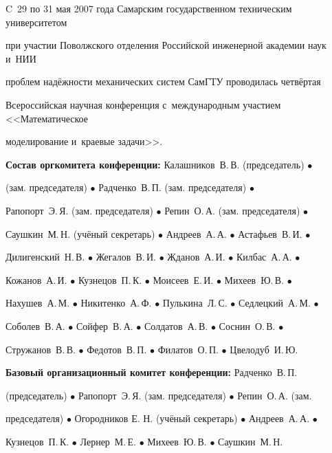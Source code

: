 C~29 по 31 мая 2007 года Самарским государственном техническим университетом 

при участии Поволжского отделения Российской инженерной академии наук и~НИИ 

проблем надёжности механических систем \mbox{СамГТУ} проводилась четвёртая 

Всероссийская научная конференция с~международным участием <<Математическое 

моделирование и~краевые задачи>>.



\smallskip



\textbf{Состав оргкомитета конференции:} Калашников~В.\,В. (председатель) $\bullet$ 

 (зам. председателя) $\bullet$ Радченко~В.\,П. (зам. председателя) $\bullet$ 

Рапопорт~Э.\,Я. (зам. председателя) $\bullet$ Репин~О.\,А. (зам. председателя) $\bullet$ 

Саушкин~М.\,Н. (учёный секретарь) $\bullet$ Андреев~А.\,А. $\bullet$ Астафьев~В.\,И. $\bullet$ 

Дилигенский~Н.\,В. $\bullet$ Жегалов~В.\,И. $\bullet$ Жданов~А.\,И. $\bullet$ Килбас~А.\,А. $\bullet$ 

Кожанов~А.\,И. $\bullet$ Кузнецов~П.\,К. $\bullet$ Моисеев~Е.\,И. $\bullet$ Михеев~Ю.\,В. $\bullet$ 

Нахушев~А.\,М. $\bullet$ Никитенко~А.\,Ф. $\bullet$ Пулькина~Л.\,С. $\bullet$ Седлецкий~А.\,М. $\bullet$ 

Соболев~В.\,А. $\bullet$ Сойфер~В.\,А. $\bullet$ Солдатов~А.\,В. $\bullet$ Соснин~О.\,В. $\bullet$ 

Стружанов~В.\,В. $\bullet$ Федотов~В.\,П. $\bullet$ Филатов~О.\,П. $\bullet$ Цвелодуб~И.\,Ю.



\smallskip



\textbf{Базовый организационный комитет конференции:} Радченко~В.\,П. 

(председатель) $\bullet$ Рапопорт~Э.\,Я. (зам. председателя) $\bullet$ Репин~О.\,А. (зам. 

председателя) $\bullet$ Огородников Е. Н. (учёный секретарь) $\bullet$ Андреев~А.\,А. $\bullet$ 

Кузнецов~П.\,К. $\bullet$ Лернер~М.\,Е. $\bullet$ Михеев~Ю.\,В. $\bullet$ Саушкин~М.\,Н.



